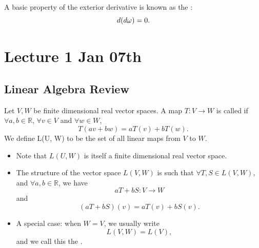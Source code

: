 \documentclass[notoc,notitlepage]{tufte-book}
\begin{document}
A basic property of the exterior derivative is known as the
:
\begin{equation*}
  \mathop{}\!d{(\mathop{}\!d{\omega})} = 0.
\end{equation*}


\label{part:exterior_differential_calculus}

\chapter{Lecture 1 Jan 07th}%
\label{chp:lecture_1_jan_07th}

\section{Linear Algebra Review}%
\label{sec:linear_algebra_review}

\begin{defn}\label{defn:linear_map}
  Let $V, W$ be finite dimensional real vector spaces. A map $T : V \to W$ is called  if $\forall a, b \in \mathbb{R}$, $\forall v \in V$ and $\forall w \in W$,
  \begin{equation*}
    T(av + bw) = aT(v) + bT(w).
  \end{equation*}
  We define L(U, W) to be the set of all linear maps from $V$ to $W$.
\end{defn}

\begin{note}
  \begin{itemize}
    \item Note that $L(U, W)$ is itself a finite dimensional real vector space.
    \item The structure of the vector space $L(V, W)$ is such that $\forall T, S \in L(V, W)$, and $\forall a, b \in \mathbb{R}$, we have
      \begin{equation*}
        aT + bS : V \to W
      \end{equation*}
      and
      \begin{equation*}
        (aT + bS)(v) = aT(v) + bS(v).
      \end{equation*}
    \item A special case: when $W = V$, we usually write
      \begin{equation*}
        L(V, W) = L(V),
      \end{equation*}
      and we call this the .
  \end{itemize}
\end{note}
\end{document}
